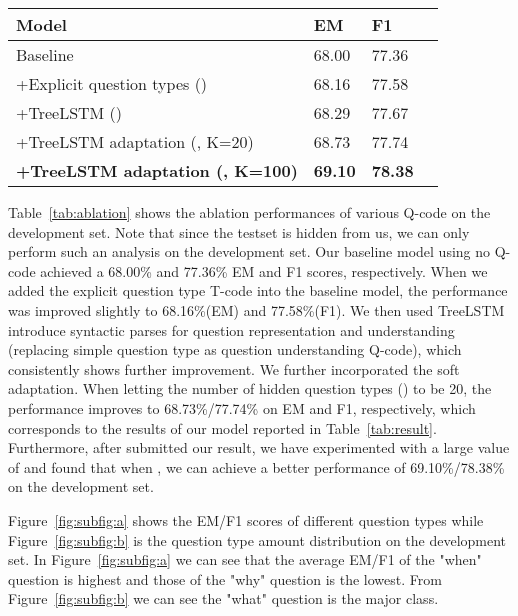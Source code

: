 \documentclass{article}
\begin{document}
\begin{table*}[ht]
	\renewcommand{\arraystretch}{1.3}
\centering
	\begin{tabular}{llll}
		\toprule
		Model    &  EM  &  F1 \\
		\midrule
		Baseline &  68.00  & 77.36   \\
        +Explicit question types () & 68.16 & 77.58 \\
        +TreeLSTM () & 68.29 & 77.67 \\
+TreeLSTM adaptation (, K=20) & 68.73 & 77.74 \\
        \textbf{+TreeLSTM adaptation (, K=100)} & \textbf{69.10} & \textbf{78.38} \\
\bottomrule
	\end{tabular}
	\caption{Performance of various Q-code on the development set.}
    \label{tab:ablation}
\end{table*}



Table~\ref{tab:ablation} shows the ablation performances of various Q-code on the development set. Note that since the testset is hidden from us, we can only perform such an analysis on the development set. Our baseline model using no Q-code achieved a 68.00\% and 77.36\% EM and F1 scores, respectively. When we added the explicit question type T-code into the baseline model, the performance was improved slightly to 68.16\%(EM) and 77.58\%(F1). We then used TreeLSTM introduce syntactic parses for question representation and understanding (replacing simple question type as question understanding Q-code), which consistently shows further improvement. We further incorporated the soft adaptation. When letting the number of hidden question types () to be 20, the performance improves to 68.73\%/77.74\% on EM and F1, respectively,  which corresponds to the results of our model reported in Table~\ref{tab:result}.  Furthermore, after submitted our result, we have experimented with a large value of  and found that when , we can achieve a better performance of 69.10\%/78.38\% on the development set.


Figure~\ref{fig:subfig:a} shows the EM/F1 scores of different question types while Figure~\ref{fig:subfig:b} is the question type amount distribution on the development set. In Figure~\ref{fig:subfig:a} we can see that the average EM/F1 of the "when" question is highest and those of the "why" question is the lowest. From Figure~\ref{fig:subfig:b} we can see the "what" question is the major class.
\end{document}
